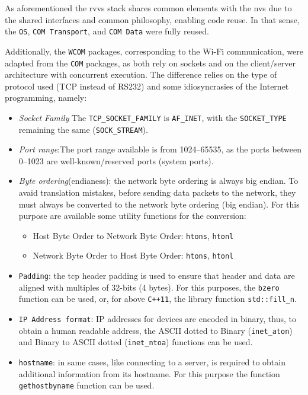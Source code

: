 As aforementioned the \gls{rvvs} stack shares common elements with the
\gls{nvs} due to the shared interfaces and common philosophy, enabling code
reuse. In that sense, the \texttt{OS}, \texttt{COM Transport}, and \texttt{COM
  Data} were fully reused.

Additionally, the \texttt{WCOM} packages, corresponding to the Wi-Fi
communication, were adapted from the \texttt{COM} packages, as both rely on
sockets and on the client/server architecture with concurrent execution. The
difference relies on the type of protocol used (TCP instead of RS232) and some
idiosyncrasies of the Internet programming, namely:
\begin{itemize}
\item \emph{Socket Family} The \texttt{TCP\_SOCKET\_FAMILY} is \texttt{AF\_INET}, with the
  \texttt{SOCKET\_TYPE} remaining the same (\texttt{SOCK\_STREAM}).
\item \emph{Port range}:The port range available is from 1024--65535, as the
  ports between 0--1023 are well-known/reserved ports (system ports).
\item \emph{Byte ordering}(endianess): the network byte ordering is always big
  endian. To avaid translation mistakes, before sending data packets to the
  network, they must always be converted to the network byte ordering (big
  endian). For this purpose are available some utility functions for the conversion:
  \begin{itemize}
  \item Host Byte Order to Network Byte Order: \texttt{htons}, \texttt{htonl}
  \item Network Byte Order to Host Byte Order: \texttt{htons}, \texttt{htonl}
  \end{itemize}
\item \texttt{Padding}: the \gls{tcp} header padding is used to ensure that
  header and data are aligned with multiples of 32-bits (4 bytes). For this
  purposes, the \texttt{bzero} function can be used, or, for above
  \texttt{C++11}, the library function \texttt{std::fill\_n}.
\item \texttt{IP Address format}: IP addresses for devices are encoded in
  binary, thus, to obtain a human readable address, the ASCII dotted to Binary
  (\texttt{inet\_aton}) and Binary to ASCII dotted (\texttt{inet\_ntoa}) functions
  can be used.
\item \texttt{hostname}: in same cases, like connecting to a server, is required
  to obtain additional information from its hostname. For this purpose the
  function \texttt{gethostbyname} function can be used.
\end{itemize}

